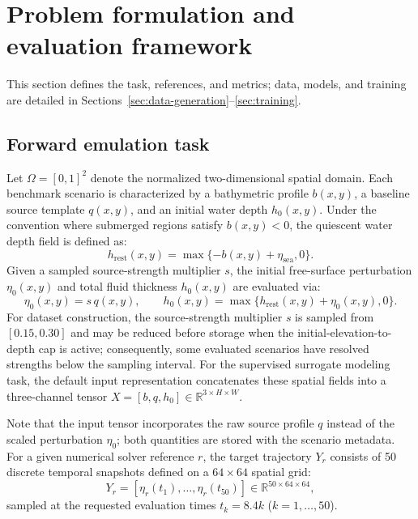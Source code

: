 \section{Problem formulation and evaluation framework}
\label{sec:methods}

This section defines the task, references, and metrics; data, models, and training are detailed in Sections~\ref{sec:data-generation}--\ref{sec:training}.

\subsection{Forward emulation task}
\label{subsec:forward-task}
Let $\Omega = [0, 1]^2$ denote the normalized two-dimensional spatial domain. Each benchmark scenario is characterized by a bathymetric profile $b(x,y)$, a baseline source template $q(x,y)$, and an initial water depth $h_0(x,y)$. Under the convention where submerged regions satisfy $b(x,y) < 0$, the quiescent water depth field is defined as:
\begin{equation}
h_{\mathrm{rest}}(x, y) = \max\{-b(x, y) + \eta_{\mathrm{sea}}, 0\}.
\end{equation}
Given a sampled source-strength multiplier $s$, the initial free-surface perturbation $\eta_0(x,y)$ and total fluid thickness $h_0(x,y)$ are evaluated via:
\begin{equation}
\eta_0(x, y) = s\,q(x, y), \qquad h_0(x, y) = \max\{h_{\mathrm{rest}}(x, y) + \eta_0(x, y), 0\}.
\end{equation}
For dataset construction, the source-strength multiplier $s$ is sampled from $[0.15, 0.30]$ and may be reduced before storage when the initial-elevation-to-depth cap is active; consequently, some evaluated scenarios have resolved strengths below the sampling interval.
For the supervised surrogate modeling task, the default input representation concatenates these spatial fields into a three-channel tensor $X = [b, q, h_0]\in\mathbb{R} ^ {3\times H\times W}$.

Note that the input tensor incorporates the raw source profile $q$ instead of the scaled perturbation $\eta_0$; both quantities are stored with the scenario metadata. For a given numerical solver reference $r$, the target trajectory $Y_r$ consists of 50 discrete temporal snapshots defined on a $64 \times 64$ spatial grid:
\begin{equation}
Y_r = \left[\eta_r(t_1), \dots, \eta_r(t_{50})\right] \in \mathbb{R}^{50 \times 64 \times 64},
\end{equation}
sampled at the requested evaluation times $t_k = 8.4k$ ($k = 1, \dots, 50$).

